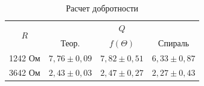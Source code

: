 \documentclass[12pt]{kiarticle} %
\begin{document}
\begin{table}[h!]%
	\centering
	\caption{Расчет добротности}
	\begin{tabular}{|c|c|c|c|}
		\hline
		\multirow{2}{*}{$ R $} & \multicolumn{3}{|c|}{$ Q $} \\
		\cline{2-4}
		& Теор. & $ f(\Theta) $ & Спираль \\
		\hline
		1242 Ом & $ 7,76 \pm 0,09 $ & $ 7,82 \pm 0,51 $ & $ 6,33 \pm 0,87 $ \\
		\hline
		3642 Ом  & $ 2,43 \pm 0,03 $ & $ 2,47 \pm 0,27 $  & $ 2,27 \pm 0,43 $ \\
		\hline
	\end{tabular}
\end{table}
\end{document}
